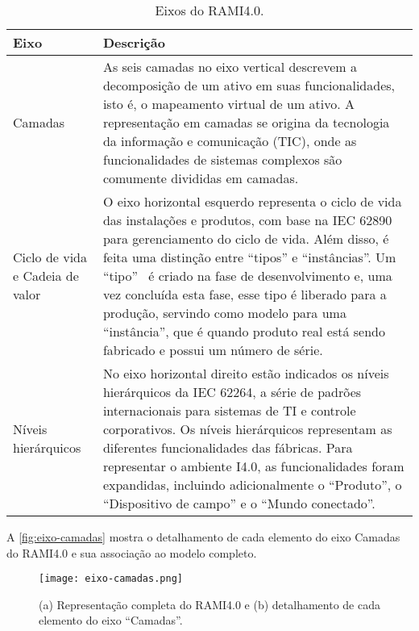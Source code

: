 	\begin{table}[htb]
		\centering
		\footnotesize
		\caption{Eixos do RAMI4.0.}
		\label{tab:rami-eixos}
		\begin{tabular}{p{3cm}p{12cm}}
			\hline
			\textbf{Eixo} &\textbf{Descrição} \\
			
			\hline
			Camadas
			& As seis camadas no eixo vertical descrevem a decomposição de um ativo em suas funcionalidades, isto é, o mapeamento virtual de um ativo. A representação em camadas se origina da tecnologia da informação e comunicação (TIC), onde as funcionalidades de sistemas complexos são comumente divididas em camadas. \\
			
			\hline
			Ciclo de vida e  Cadeia de valor
			& O eixo horizontal esquerdo representa o ciclo de vida das instalações e produtos, com base na IEC 62890 para gerenciamento do ciclo de vida. Além disso, é feita uma distinção entre ``tipos'' e ``instâncias''. Um ``tipo''~ é criado na fase de desenvolvimento e, uma vez concluída esta fase, esse tipo é liberado para a produção, servindo como modelo para uma ``instância'', que é quando produto real está sendo fabricado e possui um número de série. \\
			
			\hline
			Níveis hierárquicos
			& No eixo horizontal direito estão indicados os níveis hierárquicos da IEC 62264, a série de padrões internacionais para sistemas de TI e controle corporativos. Os níveis hierárquicos representam as diferentes funcionalidades das fábricas. Para representar o ambiente I4.0, as funcionalidades foram expandidas, incluindo adicionalmente o ``Produto'', o ``Dispositivo de campo'' e o ``Mundo conectado''. \\
			\hline
			
		\end{tabular}
	\end{table}

	A \autoref{fig:eixo-camadas} mostra o detalhamento de cada elemento do eixo Camadas do RAMI4.0 e sua associação ao modelo completo.
	
	\begin{figure}[htb]
		\centering
		\caption{(a) Representação completa do RAMI4.0 e (b) detalhamento de cada elemento do eixo ``Camadas''.}
		\label{fig:eixo-camadas}
		\texttt{[image: eixo-camadas.png]}
	\end{figure}

